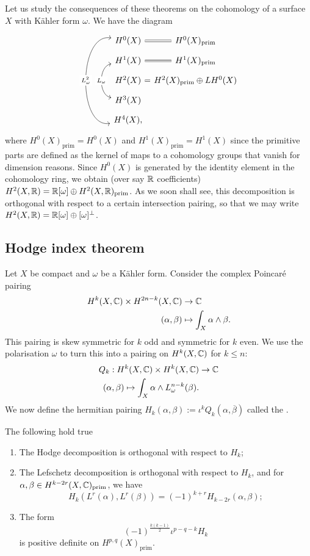%
\begin{example}
	Let us study the consequences of these theorems on the cohomology of a surface $X$ with Kähler form $\omega$. We have the diagram
	\[
	\begin{tikzcd}[row sep=0.5em,column sep= 0.5em]
		H^0(X)\ar[dddd, bend right=100,"L_\omega^2" description,  leftrightarrow]& H^0(X)_{\text{prim}}\ar[l,equal]\\H^1(X)\ar[dd, bend right=80, "L_\omega" description,leftrightarrow]& H^1(X)_{\text{prim}}\ar[l,equal]\\ H^2(X)\ar[r,equal]&H^2(X)_{\text{prim}}\oplus L H^0(X)\\H^3(X)\\H^4(X),
	\end{tikzcd}
	\]
%
where $H^0(X)_{\text{prim}}=H^0(X)$ and $H^1(X)_{\text{prim}}=H^1(X)$ since the primitive parts are defined as the kernel of maps to a cohomology groups that vanish for dimension reasons.
Since $H^0(X)$ is generated by the identity element in the cohomology ring, we obtain (over say $\mathbb R$ coefficients) $H^2(X,\mathbb R)=\mathbb R[\omega]\oplus H^2(X,\mathbb R)_{\text{prim}}$. As we soon shall see, this decomposition is orthogonal with respect to a certain intersection pairing, so that we may write $H^2(X,\mathbb R)=\mathbb R[\omega]\oplus[\omega]^\bot$.	
\end{example}
%
\subsection{Hodge index theorem}
%
Let $X$ be compact and $\omega$ be a Kähler form. Consider the complex Poincaré pairing
%
\begin{align*}
H^k(X,\mathbb C)\times H^{2n-k}(X,\mathbb C)&\to\mathbb C\\
(\alpha,\beta)&\mapsto\int_X\alpha\wedge\beta.
\end{align*}
%
This pairing is skew symmetric for $k$ odd and symmetric for $k$ even. We use the polarisation $\omega$ to turn this into a pairing on $H^k(X,\mathbb C)$ for $k\leq n$:
%
\begin{align*}
	Q_k:H^k(X,\mathbb C)\times H^k(X,\mathbb C)&\to \mathbb C\\
	(\alpha,\beta)\mapsto \int_X\alpha \wedge L_\omega^{n-k}(\beta).
\end{align*}
We now define the hermitian pairing $H_k(\alpha,\beta):=\iota^kQ_k(\alpha,\overline\beta)$ called the .
%
\begin{theorem}\label{thm:hdg-rie} The following hold true
	\begin{enumerate}
		\item The Hodge decomposition is orthogonal with respect to $H_k$;
		\item The Lefschetz decomposition is orthogonal with respect to $H_k$, and for $\alpha,\beta\in H^{k-2r}(X,\mathbb C)_{\text{prim}}$, we have
		\[
		H_k(L^r(\alpha),L^r(\beta))=(-1)^{k+r}H_{k-2r}(\alpha,\beta);
		\]
		\item The form
		\[
		(-1)^{\frac{k(k-1)}{2}}\iota^{p-q-k}H_k
		\]
		is positive definite on $H^{p,q}(X)_{\text{prim}}$.
	\end{enumerate}
\end{theorem}	

